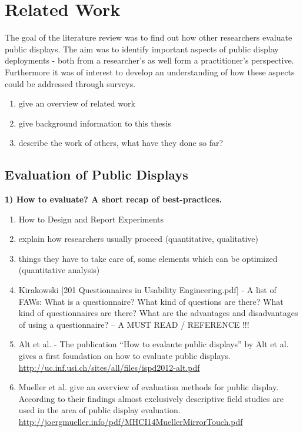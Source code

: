 \section{Related Work}
\label{sec:related-work}


	The goal of the literature review was to find out how other researchers evaluate public displays. The aim was to identify important aspects of public display deployments - both from a researcher's as well form a practitioner's perspective. Furthermore it was of interest to develop an understanding of how these aspects could be addressed through surveys. 



	\begin{enumerate}
	\item give an overview of related work
	\item give background information to this thesis
	\item describe the work of others, what have they done so far?
	\end{enumerate}



\subsection{Evaluation of Public Displays}


	\textbf{1) How to evaluate? A short recap of best-practices.}

		\begin{enumerate}
		\item How to Design and Report Experiments \cite{field2003design}
		\item explain how researchers usually proceed (quantitative, qualitative)
		\item things they have to take care of, some elements which can be optimized (quantitative analysis)


		\item Kirakowski [201 Questionnaires in Usability Engineering.pdf] - A list of FAWs: What is a questionnaire? What kind of questions are there? What kind of questionnaires are there? What are the advantages and disadvantages of using a questionnaire? 		--   A MUST READ / REFERENCE !!!



		\item Alt et al. \cite{Alt2012HowToEvaluate}  -  The publication ``How to evalaute public displays'' by Alt et al. gives a first foundation on how to evaluate public displays. \url{http://uc.inf.usi.ch/sites/all/files/ispd2012-alt.pdf} %

		\item Mueller et al. \cite{muller2014mirrortouch} give an overview of evaluation methods for public display. According to their findings almost exclusively descriptive field studies are used in the area of public display evaluation. \url{http://joergmueller.info/pdf/MHCI14MuellerMirrorTouch.pdf}

		\end{enumerate}





